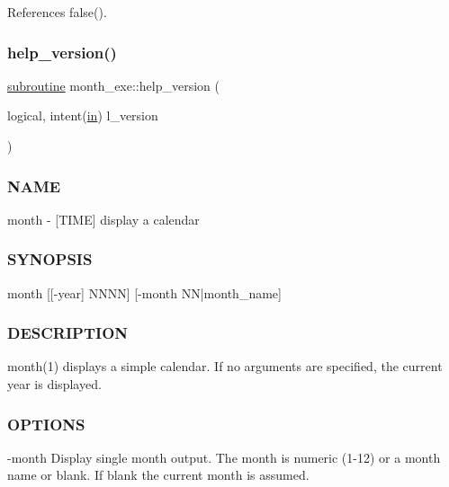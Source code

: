 References false().

\mbox{\label{month_8f90_ae30c982fccb720f9edefdd837baed72a}} 
\subsubsection{\texorpdfstring{help\+\_\+version()}{help\_version()}}
{\footnotesize\ttfamily \hyperlink{M__stopwatch_83_8txt_acfbcff50169d691ff02d4a123ed70482}{subroutine} month\+\_\+exe\+::help\+\_\+version (\begin{DoxyParamCaption}\item[{logical, intent(\hyperlink{M__journal_83_8txt_afce72651d1eed785a2132bee863b2f38}{in})}]{l\+\_\+version }\end{DoxyParamCaption})}



\subsubsection*{N\+A\+ME}

month -\/ \mbox{[}T\+I\+ME\mbox{]} display a calendar 

\subsubsection*{S\+Y\+N\+O\+P\+S\+IS}

\begin{DoxyVerb}month [[-year] NNNN] [-month NN|month_name]
\end{DoxyVerb}


\subsubsection*{D\+E\+S\+C\+R\+I\+P\+T\+I\+ON}

month(1) displays a simple calendar. If no arguments are specified, the current year is displayed.

\subsubsection*{O\+P\+T\+I\+O\+NS}

-\/month Display single month output. The month is numeric (1-\/12) or a month name or blank. If blank the current month is assumed.

